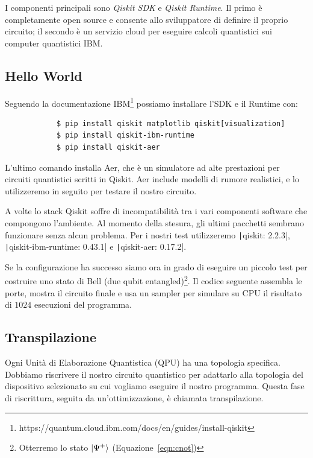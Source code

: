 I componenti principali sono \emph{Qiskit SDK} e \emph{Qiskit Runtime}. Il primo è completamente open source e consente allo sviluppatore di definire il proprio circuito; il secondo è un servizio cloud per eseguire calcoli quantistici sui computer quantistici IBM.

\subsection{Hello World}
Seguendo la documentazione IBM\footnote{https://quantum.cloud.ibm.com/docs/en/guides/install-qiskit} possiamo installare l'SDK e il Runtime con:
\begin{center}
	\vspace{-.1cm}
	\begin{minipage}{.8\linewidth}
		\begin{verbatim}
			$ pip install qiskit matplotlib qiskit[visualization]
			$ pip install qiskit-ibm-runtime
			$ pip install qiskit-aer
		\end{verbatim}
	\end{minipage}
\end{center}

L'ultimo comando installa Aer, che è un simulatore ad alte prestazioni per circuiti quantistici scritti in Qiskit. Aer include modelli di rumore realistici, e lo utilizzeremo in seguito per testare il nostro circuito.

A volte lo stack Qiskit soffre di incompatibilità tra i vari componenti software che compongono l'ambiente. Al momento della stesura, gli ultimi pacchetti sembrano funzionare senza alcun problema. Per i nostri test utilizzeremo \texttt|qiskit: 2.2.3|, \texttt|qiskit-ibm-runtime: 0.43.1| e \texttt|qiskit-aer: 0.17.2|.

Se la configurazione ha successo siamo ora in grado di eseguire un piccolo test per costruire uno stato di Bell (due qubit entangled)\footnote{Otterremo lo stato $\Ket{\Psi^+}$ (Equazione~\ref{eqn:cnot})}. Il codice seguente assembla le porte, mostra il circuito finale e usa un sampler per simulare su CPU il risultato di $1024$ esecuzioni del programma.

\begin{listingenv}[h]
	\caption{Costruzione dello stato di Bell}
	\label{lst:hello_qiskit}
\end{listingenv}

\subsection{Transpilazione}
\label{sec:transpilation}
Ogni Unità di Elaborazione Quantistica (QPU) ha una topologia specifica. Dobbiamo riscrivere il nostro circuito quantistico per adattarlo alla topologia del dispositivo selezionato su cui vogliamo eseguire il nostro programma. Questa fase di riscrittura, seguita da un'ottimizzazione, è chiamata transpilazione.

